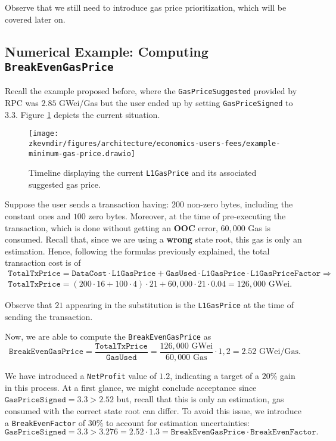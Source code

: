 Observe that we still need to introduce gas price prioritization, which will be covered later on.


\subsection{Numerical Example: Computing \texttt{BreakEvenGasPrice}}

Recall the example proposed before, where the \texttt{GasPriceSuggested} provided by RPC was $2.85$ GWei/Gas but the user ended up by setting \texttt{GasPriceSigned} to $3.3$. Figure \ref{fig:numerical-example-break-even-gas-price} depicts the current situation.

\begin{figure}[H]
\centering
\texttt{[image: \\zkevmdir/figures/architecture/economics-users-fees/example-minimum-gas-price.drawio]}
\caption{Timeline displaying the current \texttt{L1GasPrice} and its associated suggested gas price.}
\label{fig:numerical-example-break-even-gas-price}
\end{figure}

Suppose the user sends a transaction having: $200$ non-zero bytes, including the constant ones and $100$ zero bytes. Moreover, at the time of pre-executing the transaction, which is done without getting an \textbf{OOC} error, $60,000$ Gas is consumed. Recall that, since we are using a \textbf{wrong} state root, this gas is only an estimation. Hence, following the formulas previously explained, the total transaction cost is of
\begin{gather*}
\texttt{TotalTxPrice} = \texttt{DataCost} \cdot \texttt{L1GasPrice} + \texttt{GasUsed} \cdot \texttt{L1GasPrice} \cdot \texttt{L1GasPriceFactor} \Rightarrow \\
\texttt{TotalTxPrice} = \left( 200 \cdot 16 + 100 \cdot 4 \right) \cdot 21 + 60,000 \cdot 21 \cdot 0.04 = 126,000 \text{ GWei}.
\end{gather*}

Observe that $21$ appearing in the substitution is the \texttt{L1GasPrice} at the time of sending the transaction.

Now, we are able to compute the \texttt{BreakEvenGasPrice} as
\[
\texttt{BreakEvenGasPrice} = \frac{\texttt{TotalTxPrice}}{\texttt{GasUsed}} = \frac{126,000 \text{ GWei}}{60,000 \text{ Gas}} \cdot 1,2 = 2.52 \text{ GWei/Gas}.
\]

We have introduced a \texttt{NetProfit} value of $1.2$, indicating a target of a $20\%$ gain in this process. At a first glance, we might conclude acceptance since $\texttt{GasPriceSigned} = 3.3 > 2.52$ but, recall that this is only an estimation, gas consumed with the correct state root can differ. To avoid this issue, we introduce a \texttt{BreakEvenFactor} of $30\%$ to account for estimation uncertainties:
\[
\texttt{GasPriceSigned} = 3.3 > 3.276 = 2.52 \cdot 1.3 = \texttt{BreakEvenGasPrice} \cdot \texttt{BreakEvenFactor}.
\]

